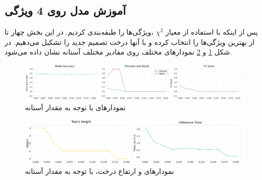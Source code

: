 \documentclass{article}
\begin{document}
	\subsection{آموزش مدل روی 4 ویژگی}
	پس از اینکه با استفاده از معیار 
	$\chi^2$
	،‌ویژگی‌ها را طبقه‌بندی کردیم. در این بخش چهار تا از بهترین ویژگی‌ها را انتخاب کرده و با آنها درخت تصمیم جدید را تشکیل می‌دهیم. در شکل 
	\ref{fig: ig 4 train}
	و
	\ref{fig: ig 4 train2}
	نمودار‌های مختلف روی مقادیر مختلف آستانه
	نشان داده می‌شود.
	\begin{figure}[H]
		\centering
		\includegraphics[scale=0.3]{figs/4_feature_train1}
		\caption{
			نمودار‌های 
			با توجه به مقدار آستانه
		}
		\label{fig: ig 4 train}
	\end{figure}
	\begin{figure}[H]
		\centering
		\includegraphics[scale=0.3]{figs/4_feature_train2}
		\caption{
			نمودار‌های 
			و ارتفاع درخت،
			با توجه به مقدار آستانه
		}
		\label{fig: ig 4 train2}
	\end{figure}
\end{document}
